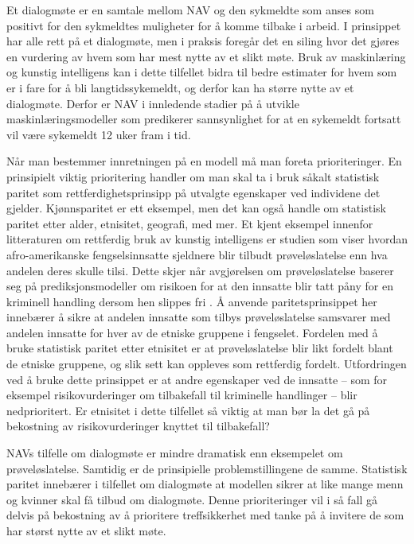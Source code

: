 \documentclass[
]{book}
\begin{document}
Et dialogmøte er en samtale mellom NAV og den sykmeldte som anses som positivt for den sykmeldtes muligheter for å komme tilbake i arbeid.
I prinsippet har alle rett på et dialogmøte, men i praksis foregår det en siling hvor det gjøres en vurdering av hvem som har mest nytte av et slikt møte.
Bruk av maskinlæring og kunstig intelligens kan i dette tilfellet bidra til bedre estimater for hvem som er i fare for å bli langtidssykemeldt, og derfor kan ha større nytte av et dialogmøte.
Derfor er NAV i innledende stadier på å utvikle maskinlæringsmodeller som predikerer sannsynlighet for at en sykemeldt fortsatt vil være sykemeldt 12 uker fram i tid.

Når man bestemmer innretningen på en modell må man foreta prioriteringer.
En prinsipielt viktig prioritering handler om man skal ta i bruk såkalt statistisk paritet som rettferdighetsprinsipp på utvalgte egenskaper ved individene det gjelder.
Kjønnsparitet er ett eksempel, men det kan også handle om statistisk paritet etter alder, etnisitet, geografi, med mer.
Et kjent eksempel innenfor litteraturen om rettferdig bruk av kunstig intelligens er studien som viser hvordan afro-amerikanske fengselsinnsatte sjeldnere blir tilbudt prøveløslatelse enn hva andelen deres skulle tilsi.
Dette skjer når avgjørelsen om prøveløslatelse baserer seg på prediksjonsmodeller om risikoen for at den innsatte blir tatt påny for en kriminell handling dersom hen slippes fri \citep{chouldechova2017fair}.
Å anvende paritetsprinsippet her innebærer å sikre at andelen innsatte som tilbys prøveløslatelse samsvarer med andelen innsatte for hver av de etniske gruppene i fengselet.
Fordelen med å bruke statistisk paritet etter etnisitet er at prøveløslatelse blir likt fordelt blant de etniske gruppene, og slik sett kan oppleves som rettferdig fordelt.
Utfordringen ved å bruke dette prinsippet er at andre egenskaper ved de innsatte -- som for eksempel risikovurderinger om tilbakefall til kriminelle handlinger -- blir nedprioritert.
Er etnisitet i dette tilfellet så viktig at man bør la det gå på bekostning av risikovurderinger knyttet til tilbakefall?

NAVs tilfelle om dialogmøte er mindre dramatisk enn eksempelet om prøveløslatelse.
Samtidig er de prinsipielle problemstillingene de samme.
Statistisk paritet innebærer i tilfellet om dialogmøte at modellen sikrer at like mange menn og kvinner skal få tilbud om dialogmøte.
Denne prioriteringer vil i så fall gå delvis på bekostning av å prioritere treffsikkerhet med tanke på å invitere de som har størst nytte av et slikt møte.
\end{document}
